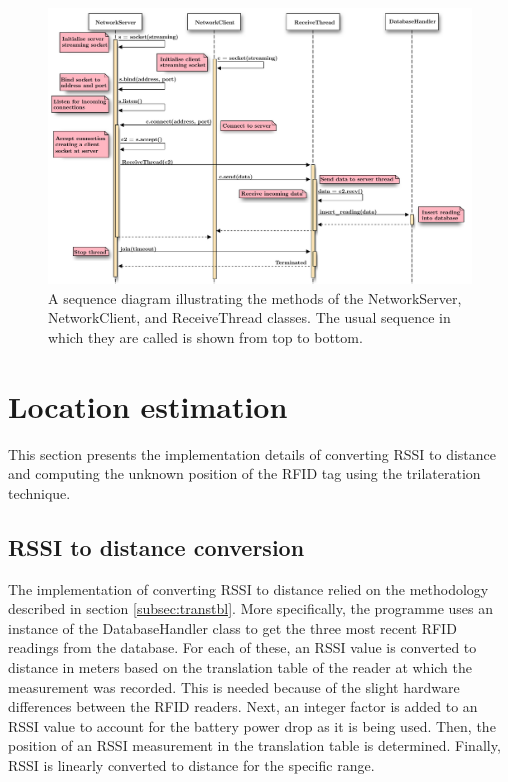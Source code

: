 \begin{figure}[h]
	\begin{center}
		\includegraphics[width=1\textwidth]{figures/seqdiag/network}
		\caption{A sequence diagram illustrating the methods of the \textsf{NetworkServer}, \textsf{NetworkClient}, and \textsf{ReceiveThread} classes. The usual sequence in which they are called is shown from top to bottom.}
		\label{fig:seqnet}
	\end{center}
\end{figure}

\section{Location estimation}
\label{sec:locest}

This section presents the implementation details of converting RSSI to distance and computing the unknown position of the RFID tag using the trilateration technique.

\subsection{RSSI to distance conversion}

The implementation of converting RSSI to distance relied on the methodology described in section \ref{subsec:transtbl}. More specifically, the programme uses an instance of the \textsf{DatabaseHandler} class to get the three most recent RFID readings from the database. For each of these, an RSSI value is converted to distance in meters based on the translation table of the reader at which the measurement was recorded. This is needed because of the slight hardware differences between the RFID readers. Next, an integer factor is added to an RSSI value to account for the battery power drop as it is being used. Then, the position of an RSSI measurement in the translation table is determined. Finally, RSSI is linearly converted to distance for the specific range.

